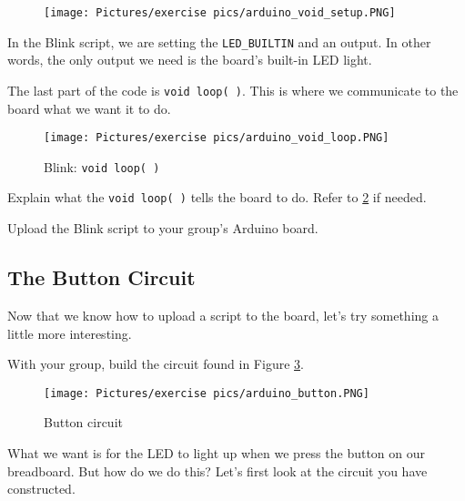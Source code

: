 \begin{figure}[h]
    \centering
    \texttt{[image: Pictures/exercise pics/arduino\_void\_setup.PNG]}
    \label{fig:arduino_void_setup}
\end{figure}

\noindent In the Blink script, we are setting the \lstinline$LED_BUILTIN$ and an output. In other words, the only output we need is the board's built-in LED light.

\noindent The last part of the code is \lstinline$void loop( )$. This is where we communicate to the board what we want it to do.

\begin{figure}[h]
    \centering
    \texttt{[image: Pictures/exercise pics/arduino\_void\_loop.PNG]}
   \caption{Blink: \lstinline$void loop( )$}
    \label{fig:arduino_void_loop}
\end{figure}

\begin{exercise}
Explain what the \lstinline$void loop( )$ tells the board to do. Refer to \ref{fig:arduino_void_loop} if needed.
\end{exercise}

\blanks

\begin{exercise}
Upload the Blink script to your group's Arduino board.
\end{exercise}


\subsection{The Button Circuit}

Now that we know how to upload a script to the board, let's try something a little more interesting. 

\begin{exercise}
With your group, build the circuit found in Figure \ref{fig:arduino_button}.
\end{exercise}

\begin{figure}[h]
    \centering
    \texttt{[image: Pictures/exercise pics/arduino\_button.PNG]}
   \caption{Button circuit}
    \label{fig:arduino_button}
\end{figure}

\noindent What we want is for the LED to light up when we press the button on our breadboard. But how do we do this? Let's first look at the circuit you have constructed.

